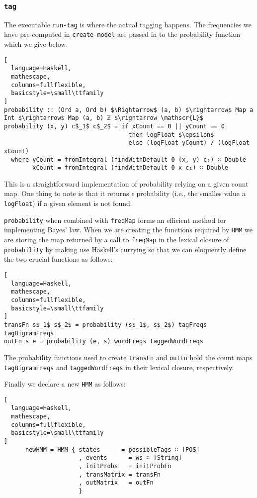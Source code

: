 \documentclass{article}
\begin{document}
\subsubsection{\texttt{tag}}
\label{par:tag}
The executable \texttt{run-tag} is where the actual tagging happens. The
frequencies we have pre-computed in \texttt{create-model} are passed in to the
probability function which we give below.
\begin{lstlisting}[
  language=Haskell,
  mathescape,
  columns=fullflexible,
  basicstyle=\small\ttfamily
]
probability :: (Ord a, Ord b) $\Rightarrow$ (a, b) $\rightarrow$ Map a Int $\rightarrow$ Map (a, b) ℤ $\rightarrow \mathscr{L}$
probability (x, y) c$_1$ c$_2$ = if xCount == 0 || yCount == 0
                                   then logFloat $\epsilon$
                                   else (logFloat yCount) / (logFloat xCount)
  where yCount = fromIntegral (findWithDefault 0 (x, y) c₂) ∷ Double
        xCount = fromIntegral (findWithDefault 0 x c₁) ∷ Double
\end{lstlisting}

This is a straightforward implementation of probability relying on a given count
map. One thing to note is that it returns $\epsilon$ probability (i.e., the
smalles value a \texttt{logFloat}) if a given element is not found.

\texttt{probability} when combined with \texttt{freqMap} forms an
efficient method for implementing Bayes' law. When we are creating the functions
required by \texttt{HMM} we are storing the map returned by a call to
\texttt{freqMap} in the lexical closure of \texttt{probability} by making use
Haskell's currying so that we can eloquently define the two crucial functions as
follows:
\begin{lstlisting}[
  language=Haskell,
  mathescape,
  columns=fullflexible,
  basicstyle=\small\ttfamily
]
transFn s$_1$ s$_2$ = probability (s$_1$, s$_2$) tagFreqs tagBigramFreqs
outFn s e = probability (e, s) wordFreqs taggedWordFreqs
\end{lstlisting}
The probability functions used to create \texttt{transFn} and \texttt{outFn} hold
the count maps \texttt{tagBigramFreqs} and \texttt{taggedWordFreqs} in their
lexical closure, respectively.

Finally we declare a new \texttt{HMM} as follows:

\newpage
\begin{lstlisting}[
  language=Haskell,
  mathescape,
  columns=fullflexible,
  basicstyle=\small\ttfamily
]
      newHMM = HMM { states      = possibleTags ∷ [POS]
                     , events      = ws ∷ [String]
                     , initProbs   = initProbFn
                     , transMatrix = transFn
                     , outMatrix   = outFn
                     }
\end{lstlisting}
\end{document}
